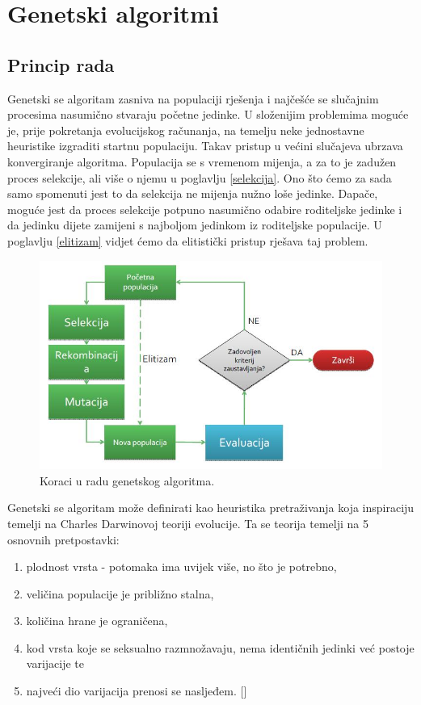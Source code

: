 \documentclass[times, utf8, zavrsni]{fer}
\begin{document}
\chapter{Genetski algoritmi}

\section{Princip rada}

Genetski se algoritam zasniva na populaciji rješenja i najčešće se slučajnim procesima nasumično stvaraju početne jedinke. U složenijim problemima moguće je, prije pokretanja evolucijskog računanja, na temelju neke jednostavne heuristike izgraditi startnu populaciju. Takav pristup u većini slučajeva ubrzava konvergiranje algoritma. Populacija se s vremenom mijenja, a za to je zadužen proces selekcije, ali više o njemu u poglavlju \ref{selekcija}. Ono što ćemo za sada samo spomenuti jest to da selekcija ne mijenja nužno loše jedinke. Dapače, moguće jest da proces selekcije potpuno nasumično odabire roditeljske jedinke i da jedinku dijete zamijeni s najboljom jedinkom iz roditeljske populacije. U poglavlju \ref{elitizam} vidjet ćemo da elitistički pristup rješava taj problem. \\

\begin{figure}[!htb]
	\centering
	\includegraphics[width=15cm]{slike/genetskiGeneral.jpg}
	\caption{Koraci u radu genetskog algoritma. }
	\label{fig:genetic-general}
\end{figure}

Genetski se algoritam može definirati kao heuristika pretraživanja koja inspiraciju temelji na Charles Darwinovoj teoriji evolucije. Ta se teorija temelji na 5 osnovnih pretpostavki: \\
\begin{enumerate}
	\item plodnost vrsta - potomaka ima uvijek više, no što je potrebno,
	\item veličina populacije je približno stalna,
	\item količina hrane je ograničena,
	\item kod vrsta koje se seksualno razmnožavaju, nema identičnih jedinki već postoje varijacije te
	\item najveći dio varijacija prenosi se nasljeđem. [\citep{PIOA}]

\end{enumerate}
\end{document}
